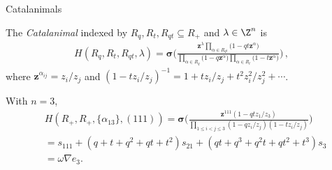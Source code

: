 \documentclass[dvipsnames]{beamer}
\newcommand{\zz}{{\boldsymbol z}}
\newcommand{\sigmabold}{\boldsymbol \sigma}
\theoremstyle{definition}
\newcounter{c}
\begin{document}
\begin{frame}{Catalanimals}
  \begin{definition}
    The \emph{Catalanimal} indexed by $R_q, R_t, R_{qt} \subseteq R_+$
    and $\lambda \in \Z^n$ is \pause\vspace{-.4mm}
    \begin{align*}
      H(R_q,R_t,R_{qt},\lambda)
      = \sigmabold
      \bigg(\frac{\zz ^\lambda \prod_{\alpha \in
      R_{qt}} \big(1-q  t \zz ^\alpha \big)} {\prod_{\alpha \in R_q} \big(1-q \zz ^\alpha\big)
      \prod_{\alpha \in R_t} \big(1-t \zz ^\alpha\big)} 
      \bigg)\,,
    \end{align*}
   where \(\zz^{\alpha_{ij}} = z_i/z_j\) and \((1-t z_i/z_j)^{-1} =
   1+tz_i/z_j+t^2 z_i^2/z_j^2+\cdots\).
  \end{definition}
  \pause
With  $n=3$,
\vspace{-3mm}
\begin{align*}
& \displaystyle H(R_+,R_+,\{\alpha_{13}\}, (111)) =
\sigmabold \Big( \frac{\zz^{111} (1 - q t z_{1} /z_3)}
{\prod_{1\le i < j \le 3}(1 - q z_{i}/ z_{j})(1 - t z_{i}/ z_{j})} \Big)  \\
&  = s_{111} + (q+t+q^2+qt+t^2)s_{21}+ (qt + q^3+ q^2t + qt^2+t^3)s_{3} \\
& = \omega \nabla e_3.
\end{align*}
\vspace{4mm}
\end{frame}
\end{document}

